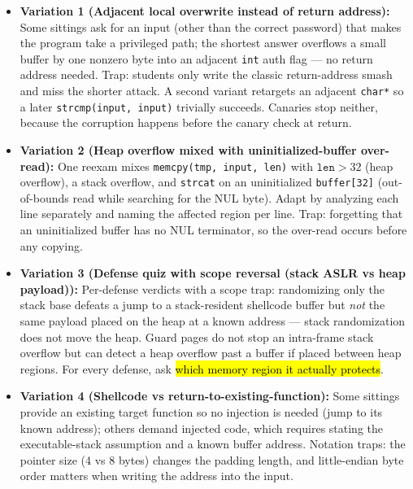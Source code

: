\documentclass[12pt, a4paper]{article}
\newcommand{\imp}[1]{\hl{#1}}                       %
\begin{document}
\begin{trapbox}
\begin{itemize}
    \item \textbf{Variation 1 (Adjacent local overwrite instead of return address):} Some sittings ask for an input (other than the correct password) that makes the program take a privileged path; the shortest answer overflows a small buffer by one nonzero byte into an adjacent \texttt{int} auth flag --- no return address needed. Trap: students only write the classic return-address smash and miss the shorter attack. A second variant retargets an adjacent \texttt{char*} so a later \texttt{strcmp(input, input)} trivially succeeds. Canaries stop neither, because the corruption happens before the canary check at return.
    \item \textbf{Variation 2 (Heap overflow mixed with uninitialized-buffer over-read):} One reexam mixes \texttt{memcpy(tmp, input, len)} with $\texttt{len} > 32$ (heap overflow), a stack overflow, and \texttt{strcat} on an uninitialized \texttt{buffer[32]} (out-of-bounds read while searching for the NUL byte). Adapt by analyzing each line separately and naming the affected region per line. Trap: forgetting that an uninitialized buffer has no NUL terminator, so the over-read occurs before any copying.
    \item \textbf{Variation 3 (Defense quiz with scope reversal (stack ASLR vs heap payload)):} Per-defense verdicts with a scope trap: randomizing only the stack base defeats a jump to a stack-resident shellcode buffer but \emph{not} the same payload placed on the heap at a known address --- stack randomization does not move the heap. Guard pages do not stop an intra-frame stack overflow but can detect a heap overflow past a buffer if placed between heap regions. For every defense, ask \imp{which memory region it actually protects}.
    \item \textbf{Variation 4 (Shellcode vs return-to-existing-function):} Some sittings provide an existing target function so no injection is needed (jump to its known address); others demand injected code, which requires stating the executable-stack assumption and a known buffer address. Notation traps: the pointer size (4 vs 8 bytes) changes the padding length, and little-endian byte order matters when writing the address into the input.
\end{itemize}
\end{trapbox}
\end{document}
